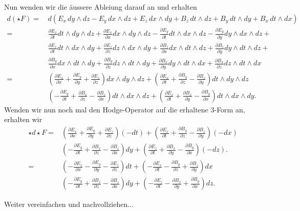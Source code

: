 Nun wenden wir die äussere Ableiung darauf an und erhalten
\begin{align*}
	d(\star F) = \,
	& d (E_{x} \, dy \wedge dz - E_{y} \, dx \wedge dz + E_{z} \, dx \wedge dy + B_z \, dt \wedge dz + B_y \, dt \wedge dy + B_x \, dt \wedge dx)\\
	=
	& \frac{\partial E_x}{\partial t} dt \wedge dy \wedge dz + \frac{\partial E_x}{\partial x} dx \wedge dy \wedge dz -
	\frac{\partial E_y}{\partial t} dt \wedge dx \wedge dz -
	\frac{\partial E_y}{\partial y} dy \wedge dx \wedge dz +\\
	& \frac{\partial E_z}{\partial t} dt \wedge dx \wedge dy +
	\frac{\partial E_z}{\partial z} dz \wedge dx \wedge dy +
	\frac{\partial B_z}{\partial x} dx \wedge dt \wedge dz +
	\frac{\partial B_z}{\partial y} dy \wedge dt \wedge dz +\\
	& \frac{\partial B_y}{\partial x} dx \wedge dt \wedge dy +
	\frac{\partial B_y}{\partial z} dz \wedge dt \wedge dy +
	\frac{\partial B_x}{\partial y} dy \wedge dt \wedge dx +
	\frac{\partial B_x}{\partial z} dz \wedge dt \wedge dx\\
	=
	&\left( \frac{\partial E_x}{\partial x} + \frac{\partial E_y}{\partial y} + \frac{\partial E_z}{\partial z} \right) dx \wedge dy \wedge dz +
	\left(\frac{\partial E_x}{\partial t} + \frac{\partial B_y}{\partial z} - \frac{\partial B_z}{\partial y} \right) dt \wedge dy \wedge dz\\
	&\left( -\frac{\partial E_y}{\partial t} + \frac{\partial B_x}{\partial z} - \frac{\partial B_z}{\partial x} \right) dt \wedge dx \wedge dz +
	\left( \frac{\partial E_z}{\partial t} + \frac{\partial B_x}{\partial y} - \frac{\partial B_y}{\partial x} \right) dt \wedge dx \wedge dy. 
\end{align*}
Wenden wir nun noch mal den Hodge-Operator auf die erhaltene 3-Form an, erhalten wir
\begin{align*}
	\star d \star F = 
	&\left( \frac{\partial E_x}{\partial x} + \frac{\partial E_y}{\partial y} + \frac{\partial E_z}{\partial z} \right) (-dt) +
	\left(\frac{\partial E_x}{\partial t} + \frac{\partial B_y}{\partial z} - \frac{\partial B_z}{\partial y} \right) (-dx)\\
	&\left( -\frac{\partial E_y}{\partial t} + \frac{\partial B_x}{\partial z} - \frac{\partial B_z}{\partial x} \right) dy +
	\left( \frac{\partial E_z}{\partial t} + \frac{\partial B_x}{\partial y} - \frac{\partial B_y}{\partial x} \right) (-dz).\\
	=
	&\left( -\frac{\partial E_x}{\partial x} -\frac{\partial E_y}{\partial y} - \frac{\partial E_z}{\partial z} \right) dt +
	\left(-\frac{\partial E_x}{\partial t} - \frac{\partial B_y}{\partial z} + \frac{\partial B_z}{\partial y} \right) dx\\
	&\left( -\frac{\partial E_y}{\partial t} + \frac{\partial B_x}{\partial z} - \frac{\partial B_z}{\partial x} \right) dy +
	\left( -\frac{\partial E_z}{\partial t} - \frac{\partial B_x}{\partial y} + \frac{\partial B_y}{\partial x} \right) dz.
\end{align*}

Weiter vereinfachen und nachvollziehen...
